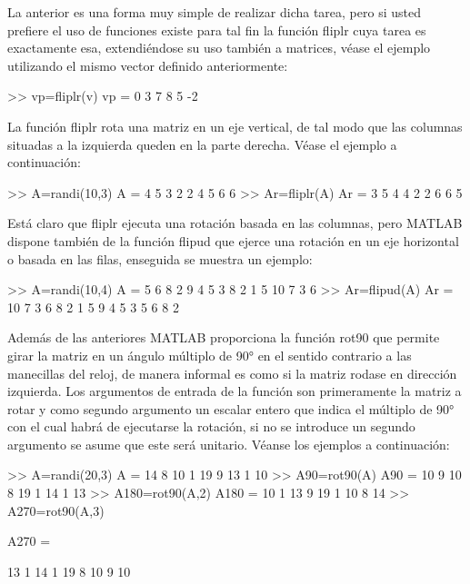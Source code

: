 La anterior es una forma muy simple de realizar dicha tarea, pero si
usted prefiere el uso de funciones existe para tal fin la función fliplr
cuya tarea es exactamente esa, extendiéndose su uso también a matrices,
véase el ejemplo utilizando el mismo vector definido anteriormente:

\begin{matlab}
>> vp=fliplr(v)
vp =
     0     3     7     8     5    -2
\end{matlab}

La función fliplr rota una matriz en un eje vertical, de tal modo que
las columnas situadas a la izquierda queden en la parte derecha. Véase
el ejemplo a continuación:

\begin{matlab}
>> A=randi(10,3)
A =
     4     5     3
     2     2     4
     5     6     6
>> Ar=fliplr(A)
Ar =
     3     5     4
     4     2     2
     6     6     5
\end{matlab}

Está claro que fliplr ejecuta una rotación basada en las columnas, pero
MATLAB dispone también de la función flipud que ejerce una rotación en
un eje horizontal o basada en las filas, enseguida se muestra un
ejemplo:

\begin{matlab}
>> A=randi(10,4)
A =
     5     6     8     2
     9     4     5     3
     8     2     1     5
    10     7     3     6
>> Ar=flipud(A)
Ar =
    10     7     3     6
     8     2     1     5
     9     4     5     3
     5     6     8     2
\end{matlab}

Además de las anteriores MATLAB proporciona la función rot90 que permite
girar la matriz en un ángulo múltiplo de 90° en el sentido contrario a
las manecillas del reloj, de manera informal es como si la matriz rodase
en dirección izquierda. Los argumentos de entrada de la función son
primeramente la matriz a rotar y como segundo argumento un escalar
entero que indica el múltiplo de 90° con el cual habrá de ejecutarse la
rotación, si no se introduce un segundo argumento se asume que este será
unitario. Véanse los ejemplos a continuación:

\begin{matlab}
>> A=randi(20,3)
A =
    14     8    10
     1    19     9
    13     1    10
>> A90=rot90(A)  %
A90 =
    10     9    10
     8    19     1
    14     1    13
>> A180=rot90(A,2)  %
A180 =
    10     1    13
     9    19     1
    10     8    14
>> A270=rot90(A,3)   %

A270 =

    13     1    14
     1    19     8
    10     9    10
\end{matlab}

